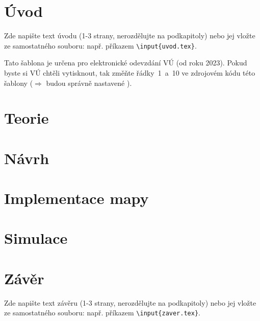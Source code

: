 \documentclass[a4paper,oneside,12pt]{book} %
\newcommand{\ti}{\textit} %
\begin{document}
\parskip=0pt
\tableofcontents %
\parskip=7pt



\chapter*{Úvod} %
%
Zde napište text úvodu (1-3 strany, nerozdělujte na podkapitoly) nebo jej vložte ze samostatného souboru: např. příkazem \texttt{\textbackslash input\{uvod.tex\}}.

Tato šablona je určena {\color{red}pro elektronické odevzdání VÚ} (od roku 2023). Pokud byste si VÚ chtěli vytisknout, tak změňte řádky~1~a~10 ve zdrojovém kódu této šablony ($\Rightarrow$ budou správně nastavené ).
%
%


\chapter{Teorie}


\chapter{Návrh}


\chapter{Implementace mapy}


\chapter{Simulace}


\chapter*{Závěr}
%
Zde napište text závěru (1-3 strany, nerozdělujte na podkapitoly) nebo jej vložte ze samostatného souboru: např. příkazem \texttt{\textbackslash input\{zaver.tex\}}.
%
%


\end{document}
